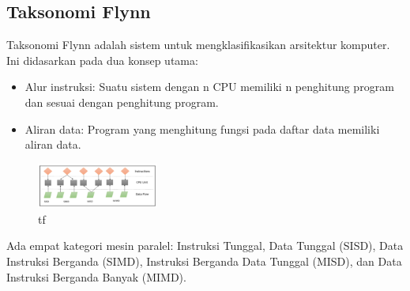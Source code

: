 \subsection{Taksonomi Flynn }
\hfill\break
Taksonomi Flynn adalah sistem untuk mengklasifikasikan arsitektur komputer. Ini didasarkan pada dua konsep utama:
\begin{itemize}
	\item Alur instruksi: Suatu sistem dengan n CPU memiliki n penghitung program dan sesuai dengan penghitung program.
	\item Aliran data: Program yang menghitung fungsi pada daftar data memiliki aliran data.
\end{itemize}
\hfill\break
    \begin{figure}[H]
        \includegraphics[width=4cm]{figures/kelompok3/1/arjun1.png}
        \centering
        \caption{tf}
    \end{figure}
Ada empat kategori mesin paralel: Instruksi Tunggal, Data Tunggal (SISD), Data Instruksi Berganda (SIMD), Instruksi Berganda Data Tunggal (MISD), dan Data Instruksi Berganda Banyak (MIMD).


